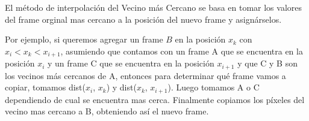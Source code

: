 \par El m\'etodo de interpolaci\'on del Vecino más Cercano se basa en tomar los valores del frame orginal mas cercano a la posici\'on del nuevo frame y asign\'arselos.

\par Por ejemplo, si queremos agregar un frame $B$ en la posici\'on $x_k$ con $x_i < x_k < x_{i+1}$, asumiendo que contamos con un frame A que se encuentra en la posici\'on $x_i$ y un frame C que se encuentra en la posici\'on $x_{i+1}$ y que C y B son los vecinos más cercanos de A, entonces para determinar qu\'e frame vamos a copiar, tomamos dist($x_i$, $x_k$) y dist($x_k$, $x_{i+1}$). Luego tomamos A o C dependiendo de cual se encuentra mas cerca. Finalmente copiamos los p\'ixeles del vecino mas cercano a B, obteniendo as\'i el nuevo frame.